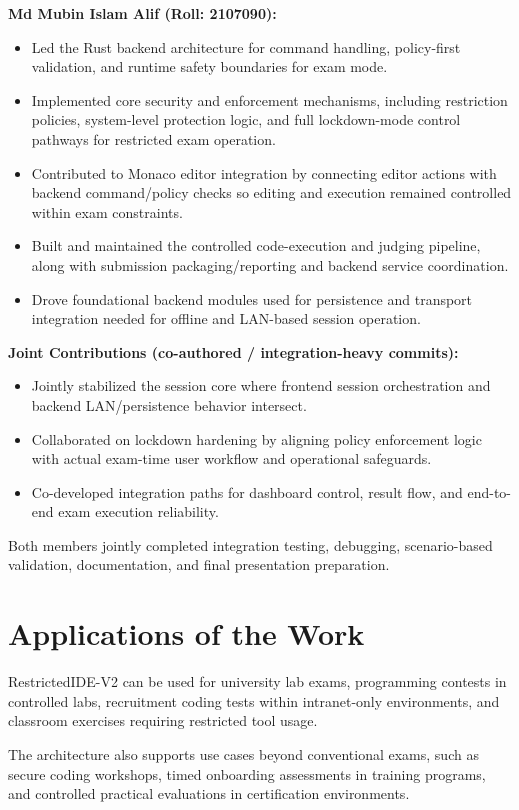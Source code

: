 \documentclass[12pt,a4paper]{report}
\begin{document}
	\noindent\textbf{Md Mubin Islam Alif (Roll: 2107090):}
	\begin{itemize}
		\item Led the Rust backend architecture for command handling, policy-first validation, and runtime safety boundaries for exam mode.
		\item Implemented core security and enforcement mechanisms, including restriction policies, system-level protection logic, and full lockdown-mode control pathways for restricted exam operation.
		\item Contributed to Monaco editor integration by connecting editor actions with backend command/policy checks so editing and execution remained controlled within exam constraints.
		\item Built and maintained the controlled code-execution and judging pipeline, along with submission packaging/reporting and backend service coordination.
		\item Drove foundational backend modules used for persistence and transport integration needed for offline and LAN-based session operation.
	\end{itemize}
	
	\textbf{Joint Contributions (co-authored / integration-heavy commits):}
	\begin{itemize}
		\item Jointly stabilized the session core where frontend session orchestration and backend LAN/persistence behavior intersect.
		\item Collaborated on lockdown hardening by aligning policy enforcement logic with actual exam-time user workflow and operational safeguards.
		\item Co-developed integration paths for dashboard control, result flow, and end-to-end exam execution reliability.
	\end{itemize}
	
	Both members jointly completed integration testing, debugging, scenario-based validation, documentation, and final presentation preparation.
	
	\section{Applications of the Work}
	RestrictedIDE-V2 can be used for university lab exams, programming contests in controlled labs, recruitment coding tests within intranet-only environments, and classroom exercises requiring restricted tool usage.
	
	The architecture also supports use cases beyond conventional exams, such as secure coding workshops, timed onboarding assessments in training programs, and controlled practical evaluations in certification environments.
	
\end{document}
